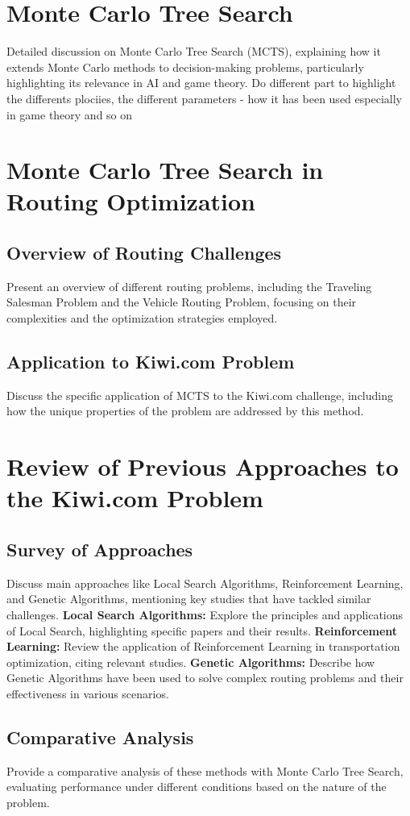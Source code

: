 \section{Monte Carlo Tree Search}
Detailed discussion on Monte Carlo Tree Search (MCTS), explaining how it extends Monte Carlo methods to decision-making problems, particularly highlighting its relevance in AI and game theory.
Do different part to highlight the differents plociies, the different parameters - how it has been used especially in game theory and so on

\section{Monte Carlo Tree Search in Routing Optimization}
\subsection{Overview of Routing Challenges}
Present an overview of different routing problems, including the Traveling Salesman Problem and the Vehicle Routing Problem, focusing on their complexities and the optimization strategies employed.
\subsection{Application to Kiwi.com Problem}
Discuss the specific application of MCTS to the Kiwi.com challenge, including how the unique properties of the problem are addressed by this method.

\section{Review of Previous Approaches to the Kiwi.com Problem}
\subsection{Survey of Approaches}
Discuss main approaches like Local Search Algorithms, Reinforcement Learning, and Genetic Algorithms, mentioning key studies that have tackled similar challenges.
\textbf{Local Search Algorithms:} Explore the principles and applications of Local Search, highlighting specific papers and their results.
\textbf{Reinforcement Learning:} Review the application of Reinforcement Learning in transportation optimization, citing relevant studies.
\textbf{Genetic Algorithms:} Describe how Genetic Algorithms have been used to solve complex routing problems and their effectiveness in various scenarios.
\subsection{Comparative Analysis}
Provide a comparative analysis of these methods with Monte Carlo Tree Search, evaluating performance under different conditions based on the nature of the problem.

